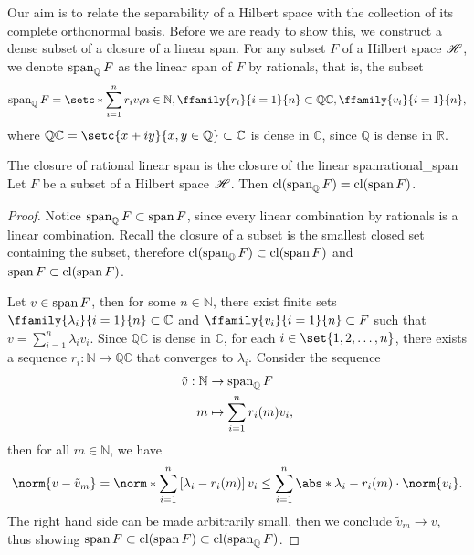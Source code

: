Our aim is to relate the separability of a Hilbert space with the collection of its complete orthonormal basis. Before we are ready to show this, we construct a dense subset of a closure of a linear span. For any subset \(F\) of a Hilbert space \(\mathscr{H}\), we denote \(\operatorname{span}_\mathbb{Q}F\) as the linear span of \(F\) by rationals, that is, the subset
\begin{equation*}
    \lspan_\mathbb{Q}F = \setc*{\sum_{i=1}^n r_i v_i}{n \in \mathbb{N}, \ffamily{r_i}{i=1}{n} \subset \mathbb{Q}\mathbb{C}, \ffamily{v_i}{i=1}{n}},
\end{equation*}
where \(\mathbb{Q}\mathbb{C} = \setc{x + iy}{x,y \in \mathbb{Q}} \subset \mathbb{C}\) is dense in \(\mathbb{C}\), since \(\mathbb{Q}\) is dense in \(\mathbb{R}\).
\begin{lemma}{The closure of rational linear span is the closure of the linear span}{rational_span}
    Let \(F\) be a subset of a Hilbert space \(\mathscr{H}\). Then \(\operatorname{cl}(\operatorname{span}_\mathbb{Q} F) = \operatorname{cl}(\operatorname{span} F)\).
\end{lemma}
\begin{proof}
    Notice \(\operatorname{span}_\mathbb{Q} F \subset \operatorname{span} F\), since every linear combination by rationals is a linear combination. Recall the closure of a subset is the smallest closed set containing the subset, therefore \(\operatorname{cl}(\operatorname{span}_\mathbb{Q} F) \subset \operatorname{cl}(\operatorname{span} F)\) and \(\operatorname{span} F \subset \operatorname{cl}(\operatorname{span} F)\).

    Let \(v \in \operatorname{span} F\), then for some \(n \in \mathbb{N}\), there exist finite sets \(\ffamily{\lambda_i}{i=1}{n}\subset \mathbb{C}\) and \(\ffamily{v_i}{i=1}{n} \subset F\) such that \(v = \sum_{i=1}^n \lambda_i v_i\). Since \(\mathbb{Q}\mathbb{C}\) is dense in \(\mathbb{C}\), for each \(i \in \set{1, 2,\dots, n}\), there exists a sequence \(r_i : \mathbb{N} \to \mathbb{Q}\mathbb{C}\) that converges to \(\lambda_i\). Consider the sequence
    \begin{align*}
        \tilde{v} : \mathbb{N} &\to \operatorname{span}_\mathbb{Q} F\\
                             m &\mapsto \sum_{i = 1}^n r_i(m) v_i,
    \end{align*}
    then for all \(m \in \mathbb{N}\), we have
    \begin{equation*}
        \norm{v - \tilde{v}_m} = \norm*{\sum_{i=1}^n \left[\lambda_i - r_i(m)\right]v_i} \leq \sum_{i=1}^n\abs*{\lambda_i - r_i(m)}\cdot\norm{v_i}.
    \end{equation*}
    The right hand side can be made arbitrarily small, then we conclude \(\tilde{v}_m \to v\), thus showing \(\operatorname{span} F \subset \operatorname{cl}(\operatorname{span} F) \subset \operatorname{cl}(\operatorname{span}_\mathbb{Q}F)\).
\end{proof}

